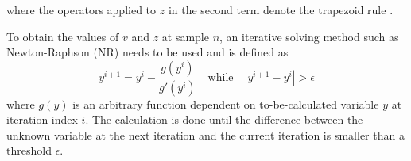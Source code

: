 \documentclass[twoside,a4paper,dvipsnames]{article}
\def\SBcomment[#1]{\textcolor{Red}{}}
\def\SWcomment[#1]{\textcolor{Green}{}}
\begin{document}
where the operators applied to $z$ in the second term denote the trapezoid rule \cite{Bilbao2009}.

To obtain the values of $v$ and $z$ at sample $n$, an iterative solving method such as Newton-Raphson (NR) needs to be used and is defined as \cite{Wallis1685}
\begin{equation}
    y^{i+1} = y^{i} - \frac{g(y^i)}{g'(y^i)} \quad \text{while} \quad |y^{i+1}-y^i| > \epsilon
\end{equation}
where $g(y)$ is an arbitrary function dependent on to-be-calculated variable $y$ at iteration index $i$. The calculation is done until the difference between the unknown variable at the next iteration and the current iteration is smaller than a threshold $\epsilon$.
\end{document}
